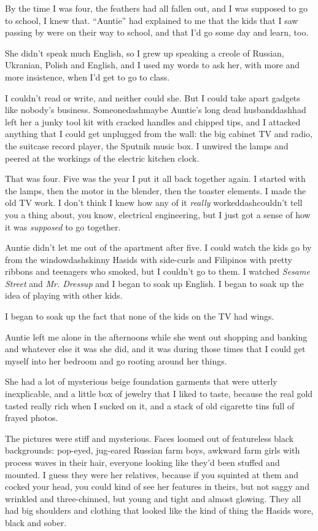 By the time I was four, the feathers had all fallen out, and I was
supposed to go to school, I knew that.  ``Auntie'' had explained to me
that the kids that I saw passing by were on their way to school, and
that I'd go some day and learn, too.

She didn't speak much English, so I grew up speaking a creole of
Russian, Ukranian, Polish and English, and I used my words to ask her,
with more and more insistence, when I'd get to go to class.

I couldn't read or write, and neither could she.  But I could take
apart gadgets like nobody's business.  Someonedash{}maybe Auntie's long
dead husbanddash{}had left her a junky tool kit with cracked handles and
chipped tips, and I attacked anything that I could get unplugged from
the wall:  the big cabinet TV and radio, the suitcase record player,
the Sputnik music box.  I unwired the lamps and peered at the workings
of the electric kitchen clock.

That was four.  Five was the year I put it all back together again.  I
started with the lamps, then the motor in the blender, then the
toaster elements.  I made the old TV work.  I don't think I knew how
any of it \textit{really} workeddash{}couldn't tell you a thing about,
you know, electrical engineering, but I just got a sense of how it was
\textit{supposed} to go together.

Auntie didn't let me out of the apartment after five.  I could watch
the kids go by from the windowdash{}skinny Hasids with side-curls and
Filipinos with pretty ribbons and teenagers who smoked, but I couldn't
go to them.  I watched \textit{Sesame Street} and \textit{Mr. 
Dressup} and I began to soak up English.  I began to soak up the idea
of playing with other kids.

I began to soak up the fact that none of the kids on the TV had wings.

Auntie left me alone in the afternoons while she went out shopping and
banking and whatever else it was she did, and it was during those
times that I could get myself into her bedroom and go rooting around
her things.

She had a lot of mysterious beige foundation garments that were
utterly inexplicable, and a little box of jewelry that I liked to
taste, because the real gold tasted really rich when I sucked on it,
and a stack of old cigarette tins full of frayed photos.

The pictures were stiff and mysterious.  Faces loomed out of
featureless black backgrounds:  pop-eyed, jug-eared Russian farm boys,
awkward farm girls with process waves in their hair, everyone looking
like they'd been stuffed and mounted.  I guess they were her
relatives, because if you squinted at them and cocked your head, you
could kind of see her features in theirs, but not saggy and wrinkled
and three-chinned, but young and tight and almost glowing.  They all
had big shoulders and clothing that looked like the kind of thing the
Hasids wore, black and sober.

